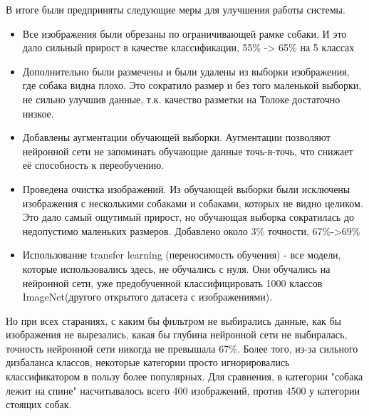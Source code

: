 В итоге были предприняты следующие меры для улучшения работы системы.
\begin{itemize}
    \item Все изображения были обрезаны по ограничивающей рамке собаки. И это дало сильный прирост в качестве классификации, 55\% -> 65\% на 5 классах
    \item Дополнительно были размечены и были удалены из выборки изображения, где собака видна плохо. Это сократило размер и без того маленькой выборки, не сильно улучшив данные, т.к. качество разметки на Толоке достаточно низкое.
    \item Добавлены аугментации обучающей выборки. Аугментации позволяют нейронной сети не запоминать обучающие данные точь-в-точь, что снижает её способность к переобучению.
    \item Проведена очистка изображений. Из обучающей выборки были исключены изображения с несколькими собаками и собаками, которых не видно целиком. Это дало самый ощутимый прирост, но обучающая выборка сократилась до недопустимо маленьких размеров. Добавлено около 3\% точности, 67\%->69\%
    \item Использование transfer learning (переносимость обучения) - все модели, которые использовались здесь, не обучались с нуля. Они обучались на нейронной сети, уже предобученной классифицировать 1000 классов ImageNet(другого открытого датасета с изображениями).
\end{itemize}

Но при всех стараниях, с каким бы фильтром не выбирались данные, как бы изображения не вырезались, какая бы глубина нейронной сети не выбиралась, точность нейронной сети никогда не превышала 67\%. Более того, из-за сильного дизбаланса классов, некоторые категории просто игнорировались классификатором в пользу более популярных. Для сравнения, в категории "собака лежит на спине" насчитывалось всего 400 изображений, против 4500 у категории стоящих собак. 

